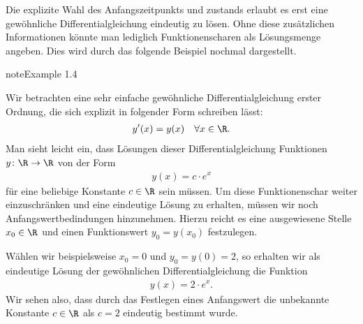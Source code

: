 \documentclass[letterpaper,10pt,english]{jupyterBook}
\begin{document}
\sphinxAtStartPar
Die explizite Wahl des Anfangszeitpunkts und \sphinxhyphen{}zustands erlaubt es erst eine gewöhnliche Differentialgleichung eindeutig zu lösen.
Ohne diese zusätzlichen Informationen könnte man lediglich Funktionenscharen als Lösungsmenge angeben.
Dies wird durch das folgende Beispiel nochmal dargestellt.
\label{ode/repetition:example-6}
\begin{sphinxadmonition}{note}{Example 1.4}



\sphinxAtStartPar
Wir betrachten eine sehr einfache gewöhnliche Differentialgleichung erster Ordnung, die sich explizit in folgender Form schreiben lässt:
\begin{equation*}
\begin{split}y'(x) = y(x) \quad \forall x \in \R.\end{split}
\end{equation*}
\sphinxAtStartPar
Man sieht leicht ein, dass Lösungen dieser Differentialgleichung Funktionen \(y \colon \R \rightarrow \R\) von der Form
\begin{equation*}
\begin{split}y(x) = c\cdot e^x\end{split}
\end{equation*}
\sphinxAtStartPar
für eine beliebige Konstante \(c \in \R\) sein müssen.
Um diese Funktionenschar weiter einzuschränken und eine eindeutige Lösung zu erhalten, müssen wir noch Anfangswertbedindungen hinzunehmen.
Hierzu reicht es eine ausgewiesene Stelle \(x_0 \in \R\) und einen Funktionswert \(y_0 = y(x_0)\) festzulegen.

\sphinxAtStartPar
Wählen wir beispielsweise \(x_0 = 0\) und \(y_0 = y(0) = 2\), so erhalten wir als eindeutige Lösung der gewöhnlichen Differentialgleichung die Funktion
\begin{equation*}
\begin{split}y(x) = 2\cdot e^x.\end{split}
\end{equation*}
\sphinxAtStartPar
Wir sehen also, dass durch das Festlegen eines Anfangswert die unbekannte Konstante \(c \in \R\) als \(c=2\) eindeutig bestimmt wurde.
\end{sphinxadmonition}
\end{document}
